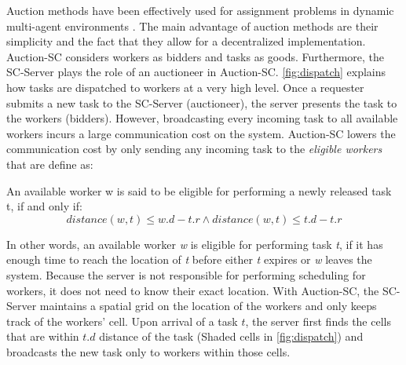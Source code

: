 

Auction methods have been effectively used for assignment problems in dynamic multi-agent environments \cite{Mehta05,Lagoudakis04}. The main advantage of auction methods are their simplicity and the fact that they allow for a decentralized implementation. Auction-SC considers workers as bidders and tasks as goods. Furthermore, the SC-Server plays the role of an auctioneer in Auction-SC. \cref{fig:dispatch} explains how tasks are dispatched to workers at a very high level. Once a requester submits a new task to the SC-Server (auctioneer), the server presents the task to the workers (bidders). However, broadcasting every incoming task to all available workers incurs a large communication cost on the system. Auction-SC lowers the communication cost by only sending any incoming task to the \textit{eligible workers} that are define as:

\begin{definition} 
An available worker w is said to be eligible for performing a newly released task t, if and only if:
\begin{equation*}
distance(w, t) \leq w.d - t.r \wedge distance(w, t) \leq t.d - t.r
\end{equation*}
\end{definition}

\noindent In other words, an available worker \textit{w} is eligible for performing task \textit{t}, if it has enough time to reach the location of \textit{t} before either \textit{t} expires or \textit{w} leaves the system. Because the server is not responsible for performing scheduling for workers, it does not need to know their exact location. With Auction-SC, the SC-Server maintains a spatial grid on the location of the workers and only keeps track of the workers' cell. Upon arrival of a task $t$, the server first finds the cells that are within $t.d$ distance of the task (Shaded cells in \cref{fig:dispatch}) and broadcasts the new task only to workers within those cells.\\

